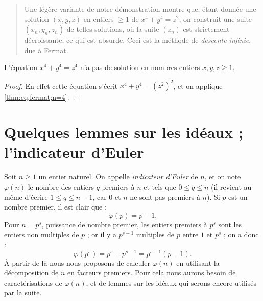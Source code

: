 \documentclass[11pt, useosf,
  title in boldface,
  theorem in new line,
  theorem numbering = section,
  number theorems separately,
]{simplivre}
\begin{document}
\enlargethispage*{\baselineskip}
\vspace{-.2\baselineskip}
    \begin{quote}
        Une légère variante de notre démonstration montre que, étant donnée une solution \( (x,y,z) \) en entiers \( \geqslant 1 \) de \( x^4+y^4=z^2 \), on construit une suite \( (x_n,y_n,z_n) \) de telles solutions, où la suite \( (z_n) \) est strictement décroissante, ce qui est absurde. Ceci est la méthode de \emph{descente infinie}, due à Fermat.
    \end{quote}

    \begin{corollary}
        L'équation \( x^4+y^4=z^4 \) n'a pas de solution en nombres entiers \( x,y,z \geqslant 1 \).
    \end{corollary}
    \begin{proof}
        En effet cette équation s'écrit \( x^4+y^4=(z^2)^2 \), et on applique \cref{thm:eq.fermat;n=4}.
    \end{proof}

\section{Quelques lemmes sur les idéaux ; l'indicateur d'Euler}

    Soit \( n \geqslant 1 \) un entier naturel. On appelle \emph{indicateur d'Euler} de \( n \), et on note \( \varphi(n) \) le nombre des entiers \( q \) premiers à \( n \) et tels que \( 0 \leqslant q \leqslant n \) (il revient au même d'écrire \( 1 \leqslant q \leqslant n-1 \), car \( 0 \) et \( n \) ne sont pas premiers à \( n \)). Si \( p \) est un nombre premier, il est clair que :
    \begin{equation}
        \varphi(p) = p-1.
    \end{equation}
    Pour \( n = p^s \), puissance de nombre premier, les entiers premiers à \( p^s \) sont les entiers non multiples de \( p \) ; or il y a \( p^{s-1} \) multiples de \( p \) entre \( 1 \) et \( p^s \) ; on a donc :
    \begin{equation}\label{eq:indicateur d'Euler;puissance de nombre premier}
        \varphi(p^s) = p^s-p^{s-1} = p^{s-1}(p-1).
    \end{equation}
    À partir de là nous nous proposons de calculer \( \varphi(n) \) en utilisant la décomposition de \( n \) en facteurs premiers. Pour cela nous aurons besoin de caractérisations de \( \varphi(n) \), et de lemmes sur les idéaux qui serons encore utilisés par la suite.
\end{document}
